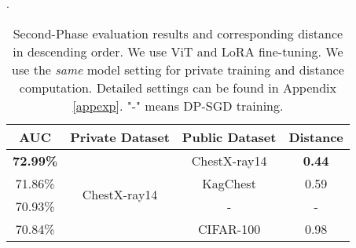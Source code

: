 \documentclass[11pt]{article}
\begin{document}
\begin{table}[!h]
\centering
\caption{Second-Phase evaluation results and corresponding distance in descending order. We use ViT and LoRA fine-tuning. We use the \emph{{same}} model setting for private training and distance computation. Detailed settings can be found in Appendix \ref{appexp}. "-" means DP-SGD training.}.
\begin{tabular}{cccc}
\hline
AUC              & Private Dataset               & Public Dataset & Distance      \\ \hline
\textbf{72.99\%} & \multirow{4}{*}{ChestX-ray14} & ChestX-ray14   & \textbf{0.44} \\ \cline{1-1} \cline{3-4} 
71.86\%          &                               & KagChest       & 0.59          \\ \cline{1-1} \cline{3-4} 
70.93\%          &                               & -              & -             \\ \cline{1-1} \cline{3-4} 
70.84\%          &                               & CIFAR-100      & 0.98          \\ \hline
\end{tabular}
\label{2ndchestvit}
\end{table}
\end{document}
